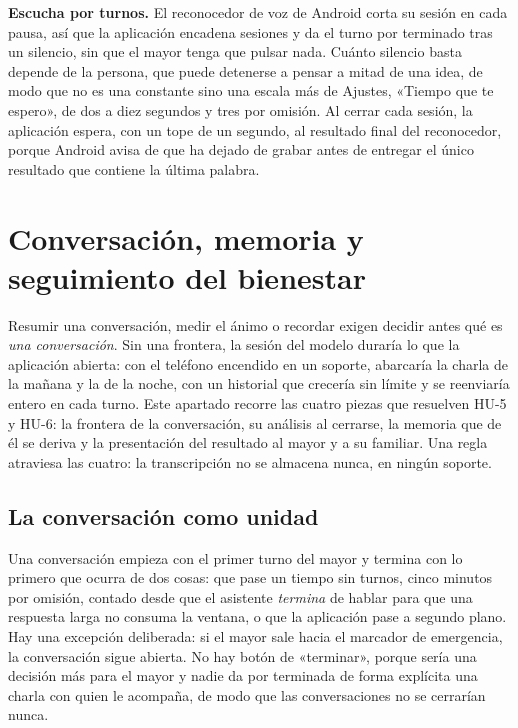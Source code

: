 \textbf{Escucha por turnos.} El reconocedor de voz de Android corta su sesión en cada pausa, así que la
aplicación encadena sesiones y da el turno por terminado tras un silencio, sin que el mayor tenga que pulsar
nada. Cuánto silencio basta depende de la persona, que puede detenerse a pensar a mitad de una idea, de modo
que no es una constante sino una escala más de Ajustes, «Tiempo que te espero», de dos a diez segundos y
tres por omisión. Al cerrar cada sesión, la aplicación espera, con un tope de un segundo, al resultado final
del reconocedor, porque Android avisa de que ha dejado de grabar antes de entregar el único resultado que
contiene la última palabra.

\section{Conversación, memoria y seguimiento del bienestar}
\label{sec:conversacion}

Resumir una conversación, medir el ánimo o recordar exigen decidir antes qué es \emph{una conversación}. Sin
una frontera, la sesión del modelo duraría lo que la aplicación abierta: con el teléfono encendido en un
soporte, abarcaría la charla de la mañana y la de la noche, con un historial que crecería sin límite y se
reenviaría entero en cada turno. Este apartado recorre las cuatro piezas que resuelven HU-5 y HU-6: la
frontera de la conversación, su análisis al cerrarse, la memoria que de él se deriva y la presentación del
resultado al mayor y a su familiar. Una regla atraviesa las cuatro: la transcripción no se almacena nunca,
en ningún soporte.

\subsection{La conversación como unidad}

Una conversación empieza con el primer turno del mayor y termina con lo primero que ocurra de dos cosas:
que pase un tiempo sin turnos, cinco minutos por omisión, contado desde que el asistente
\emph{termina} de hablar para que una respuesta larga no consuma la ventana, o que la aplicación pase a
segundo plano. Hay una excepción deliberada: si el mayor sale hacia el marcador de emergencia, la
conversación sigue abierta. No hay botón de «terminar», porque sería una decisión más para el mayor y nadie
da por terminada de forma explícita una charla con quien le acompaña, de modo que las conversaciones no se
cerrarían nunca.

